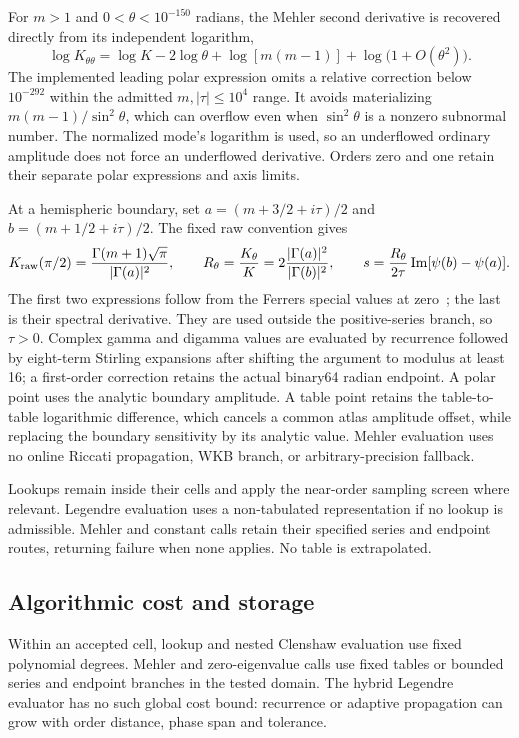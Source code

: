 ﻿\documentclass[11pt,a4paper]{article}
\begin{document}
For $m>1$ and $0<\theta<10^{-150}$ radians, the Mehler second derivative is recovered directly from its independent logarithm,
\begin{equation}
 \log K_{\theta\theta}
 =\log K-2\log\theta+\log[m(m-1)]+\log\bigl(1+O(\theta^2)\bigr).
 \label{eq:mehler_tiny_second}
\end{equation}
The implemented leading polar expression omits a relative correction below $10^{-292}$ within the admitted $m,|\tau|\leq10^4$ range. It avoids materializing $m(m-1)/\sin^2\theta$, which can overflow even when $\sin^2\theta$ is a nonzero subnormal number. The normalized mode's logarithm is used, so an underflowed ordinary amplitude does not force an underflowed derivative. Orders zero and one retain their separate polar expressions and axis limits.

At a hemispheric boundary, set $a=(m+3/2+i\tau)/2$ and $b=(m+1/2+i\tau)/2$. The fixed raw convention gives
\[
 K_{\rm raw}(\pi/2)=\frac{\Gamma(m+1)\sqrt\pi}{|\Gamma(a)|^2},\qquad
 R_\theta=\frac{K_\theta}{K}=2\frac{|\Gamma(a)|^2}{|\Gamma(b)|^2},\qquad
 s=\frac{R_\theta}{2\tau}\operatorname{Im}[\psi(b)-\psi(a)].
\]
The first two expressions follow from the Ferrers special values at zero~\citep{DLMF14SpecialValues}; the last is their spectral derivative. They are used outside the positive-series branch, so $\tau>0$. Complex gamma and digamma values are evaluated by recurrence followed by eight-term Stirling expansions after shifting the argument to modulus at least 16; a first-order correction retains the actual binary64 radian endpoint. A polar point uses the analytic boundary amplitude. A table point retains the table-to-table logarithmic difference, which cancels a common atlas amplitude offset, while replacing the boundary sensitivity by its analytic value. Mehler evaluation uses no online Riccati propagation, WKB branch, or arbitrary-precision fallback.

Lookups remain inside their cells and apply the near-order sampling screen where relevant. Legendre evaluation uses a non-tabulated representation if no lookup is admissible. Mehler and constant calls retain their specified series and endpoint routes, returning failure when none applies. No table is extrapolated.

\subsection{Algorithmic cost and storage}
\label{sec:algorithmic_cost}

Within an accepted cell, lookup and nested Clenshaw evaluation use fixed polynomial degrees. Mehler and zero-eigenvalue calls use fixed tables or bounded series and endpoint branches in the tested domain. The hybrid Legendre evaluator has no such global cost bound: recurrence or adaptive propagation can grow with order distance, phase span and tolerance.
\end{document}
